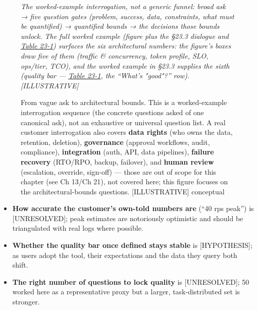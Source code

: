 \begin{figure}
\centering
{}
\caption[From vague ask to architectural bounds]{From vague ask to architectural bounds. This is a worked-example interrogation sequence (the concrete questions asked of one canonical ask), not an exhaustive or universal question list. A real customer interrogation also covers \textbf{data rights} (who owns the data, retention, deletion), \textbf{governance} (approval workflows, audit, compliance), \textbf{integration} (auth, API, data pipelines), \textbf{failure recovery} (RTO/RPO, backup, failover), and \textbf{human review} (escalation, override, sign-off) --- those are out of scope for this chapter (see Ch 13/Ch 21), not covered here; this figure focuses on the architectural-bounds questions. \mbox{{[}ILLUSTRATIVE{]}} conceptual}

\label{fig:23.1}\emph{The worked-example interrogation, not a generic funnel: broad ask
→ five question gates (problem, success, data, constraints, what must be
quantified) → quantified bounds → the decisions those bounds unlock. The
full worked example (figure plus the §23.3 dialogue and \hyperref[tab:23.1]{Table 23-1})
surfaces the six architectural numbers: the figure's boxes draw five of
them (traffic \& concurrency, token profile, SLO, ops/tier, TCO), and
the worked example in §23.3 supplies the sixth (quality bar --- \hyperref[tab:23.1]{Table 23-1}, the ``What's "good"?'' row). \mbox{{[}ILLUSTRATIVE{]}}}

\end{figure}\label{what-we-still-dont-know}


\begin{itemize}
\tightlist
\item
  \textbf{How accurate the customer's own-told numbers are} (``40 rps
  peak'') is \mbox{{[}UNRESOLVED{]}}; peak estimates are notoriously optimistic
  and should be triangulated with real logs where possible.
\item
  \textbf{Whether the quality bar once defined stays stable} is
  \mbox{{[}HYPOTHESIS{]}}; as users adopt the tool, their expectations and the
  data they query both shift.
\item
  \textbf{The right number of questions to lock quality} is
  \mbox{{[}UNRESOLVED{]}}; 50 worked here as a representative proxy but a
  larger, task-distributed set is stronger.
\end{itemize}

